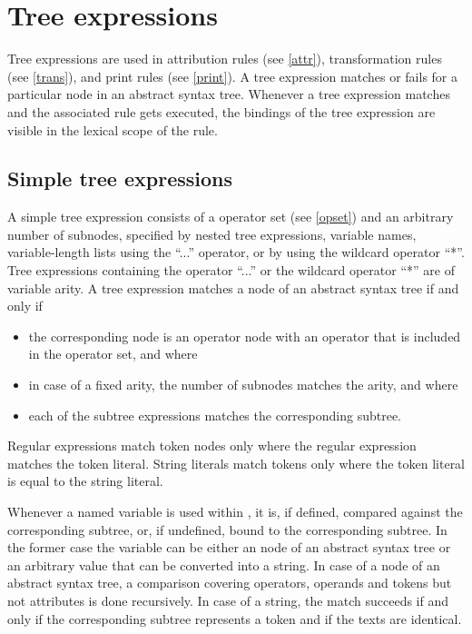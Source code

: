\chapter{Tree expressions}\label{treeexpr}

Tree expressions are used in attribution rules (see \ref{attr}),
transformation rules (see \ref{trans}), and print rules (see
\ref{print}). A tree expression matches or fails for a particular node
in an abstract syntax tree. Whenever a tree expression matches and the
associated rule gets executed, the bindings of the tree expression are
visible in the lexical scope of the rule.

\section{Simple tree expressions}

A simple tree expression consists of a operator set (see \ref{opset}) and an arbitrary number of subnodes, specified
by nested tree expressions, variable names, variable-length lists
using the ``...'' operator, or by using the wildcard operator
``*''. Tree expressions containing the operator ``...'' or the wildcard
operator ``*'' are of variable arity.  A tree
expression matches a node of an abstract syntax tree if and only if
\begin{itemize}
   \item the corresponding node is an operator node
      with an operator that is included in the operator set, and where
   \item in case of a fixed arity, the number of subnodes matches
      the arity, and where
   \item each of the subtree expressions matches the corresponding subtree.
\end{itemize}

Regular expressions match token nodes only
where the regular expression matches the token literal. String literals
match tokens only where the token literal is equal to the string literal.

Whenever a named variable is used within , it
is, if defined, compared against the corresponding subtree, or, if
undefined, bound to the corresponding subtree. In the former case the
variable can be either an node of an abstract syntax tree or an arbitrary value
that can be converted into a string. In case of a node of an abstract
syntax tree, a comparison covering operators, operands and tokens but
not attributes is done recursively. In case of a string, the match
succeeds if and only if the corresponding subtree represents a token
and if the texts are identical.

